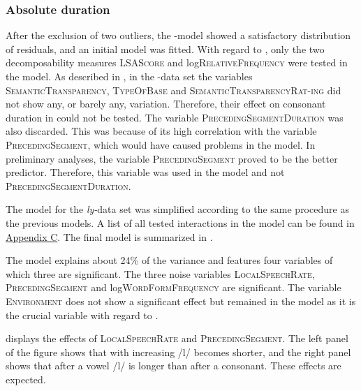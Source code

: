 \subsubsection{Absolute duration}\largerpage

After the exclusion of two outliers, the -model showed a satisfactory distribution of residuals, and an initial model was fitted. 
With regard to , only the two decomposability measures \textsc{LSAScore} and log\textsc{RelativeFrequency} were tested in the model. As described in , in the -data set the variables \textsc{SemanticTransparency}, \textsc{TypeOfBase}  and \textsc{SemanticTransparencyRat-ing} did not show any, or barely any, variation. Therefore, their effect on consonant duration in  could not be tested. The variable \textsc{PrecedingSegmentDuration} was also discarded. This was because of its high correlation with the variable \textsc{PrecedingSegment}, which would have caused  problems in the model. In preliminary analyses, the variable \textsc{PrecedingSegment} proved to be the better predictor. Therefore, this variable was used in the model and not \textsc{PrecedingSegmentDuration}. 

The model for the \textit{ly-}data set was simplified according to the same procedure as the  previous models. A list of all tested interactions in the model can be found in \hyperref[Appendix C: Summaries of tested interactions in corpus study]{Appendix C}. 
The final model is summarized in .


The model explains about 24\% of the variance and features four variables of which three are significant. The three noise variables \textsc{LocalSpeechRate}, \textsc{PrecedingSegment} and log\textsc{WordFormFrequency} are significant. 
The variable \textsc{Environment} does not show a significant effect but remained in the model as it is the crucial variable with regard to .



 displays the effects of \textsc{LocalSpeechRate} and \textsc{PrecedingSegment}. The left panel of the figure shows that with increasing  /l/ becomes shorter, and the right panel shows that after a vowel /l/ is longer than after a consonant. These effects are expected.\pagebreak



